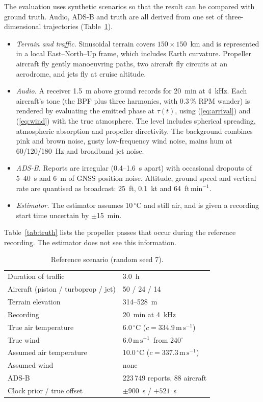 \documentclass[10pt,twocolumn,letterpaper]{article}
\newcommand{\ms}{\ensuremath{\,\mathrm{m\,s^{-1}}}}
\begin{document}
The evaluation uses synthetic scenarios so that the result can be compared with ground truth. Audio, ADS-B and
truth are all derived from one set of three-dimensional trajectories (Table~\ref{tab:scenario}).
\begin{itemize}
\item \emph{Terrain and traffic.} Sinusoidal terrain covers $150\times150$~km and is represented in a local
  East--North--Up frame, which includes Earth curvature. Propeller aircraft fly gently manoeuvring paths, two
  aircraft fly circuits at an aerodrome, and jets fly at cruise altitude.
\item \emph{Audio.} A receiver 1.5~m above ground records for 20~min at 4~kHz. Each aircraft's tone (the BPF plus
  three harmonics, with 0.3\,\% RPM wander) is rendered by evaluating the emitted phase at $\tau(t)$, using
  (\ref{eq:arrival}) and (\ref{eq:wind}) with the true atmosphere. The level includes spherical spreading,
  atmospheric absorption and propeller directivity. The background combines pink and brown noise, gusty
  low-frequency wind noise, mains hum at 60/120/180~Hz and broadband jet noise.
\item \emph{ADS-B.} Reports are irregular (0.4--1.6~s apart) with occasional dropouts of 5--40~s and 6~m of GNSS
  position noise. Altitude, ground speed and vertical rate are quantised as broadcast: 25~ft, 0.1~kt and
  64~ft\,min$^{-1}$.
\item \emph{Estimator.} The estimator assumes 10\,$^\circ$C and still air, and is given a recording start time
  uncertain by $\pm$15~min.
\end{itemize}
Table~\ref{tab:truth} lists the propeller passes that occur during the reference recording. The estimator does not
see this information.

\begin{table}[t]
\caption{Reference scenario (random seed 7).}\label{tab:scenario}
\centering\small\setlength{\tabcolsep}{4pt}
\begin{tabular}{@{}ll@{}}
\toprule
Duration of traffic & 3.0~h \\
Aircraft (piston / turboprop / jet) & 50 / 24 / 14 \\
Terrain elevation & 314--528~m \\
Recording & 20~min at 4~kHz \\
True air temperature & 6.0\,$^\circ$C ($c=334.9\ms$) \\
True wind & 6.0\ms\ from 240$^\circ$ \\
Assumed air temperature & 10.0\,$^\circ$C ($c=337.3\ms$) \\
Assumed wind & none \\
ADS-B & 223\,749 reports, 88 aircraft \\
Clock prior / true offset & $\pm900$~s / $+521$~s \\
\bottomrule
\end{tabular}
\end{table}
\end{document}
